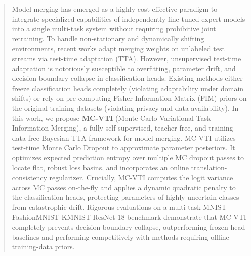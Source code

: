 \documentclass{article}
\theoremstyle{plain}
\theoremstyle{definition}
\theoremstyle{remark}
\begin{document}

\printAffiliationsAndNotice{}

\begin{abstract}
  Model merging has emerged as a highly cost-effective paradigm to integrate specialized capabilities of independently fine-tuned expert models into a single multi-task system without requiring prohibitive joint retraining. To handle non-stationary and dynamically shifting environments, recent works adapt merging weights on unlabeled test streams via test-time adaptation (TTA). However, unsupervised test-time adaptation is notoriously susceptible to overfitting, parameter drift, and decision-boundary collapse in classification heads. Existing methods either freeze classification heads completely (violating adaptability under domain shifts) or rely on pre-computing Fisher Information Matrix (FIM) priors on the original training datasets (violating privacy and data availability). In this work, we propose \textbf{MC-VTI} (Monte Carlo Variational Task-Information Merging), a fully self-supervised, teacher-free, and training-data-free Bayesian TTA framework for model merging. MC-VTI utilizes test-time Monte Carlo Dropout to approximate parameter posteriors. It optimizes expected prediction entropy over multiple MC dropout passes to locate flat, robust loss basins, and incorporates an online translation-consistency regularizer. Crucially, MC-VTI computes the logit variance across MC passes on-the-fly and applies a dynamic quadratic penalty to the classification heads, protecting parameters of highly uncertain classes from catastrophic drift. Rigorous evaluations on a multi-task MNIST-FashionMNIST-KMNIST ResNet-18 benchmark demonstrate that MC-VTI completely prevents decision boundary collapse, outperforming frozen-head baselines and performing competitively with methods requiring offline training-data priors.
\end{abstract}
\end{document}
